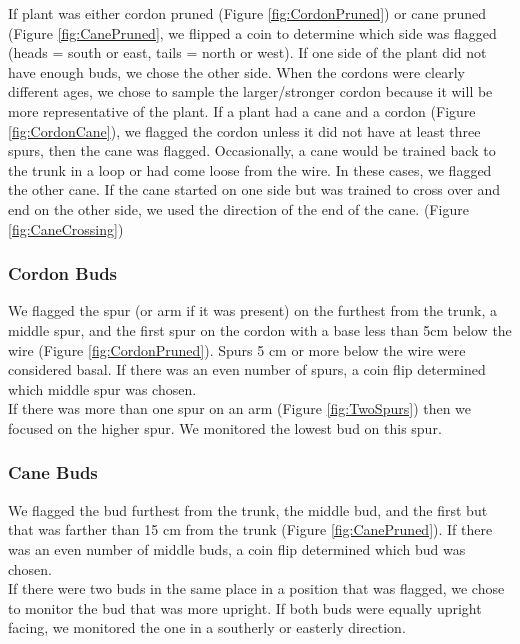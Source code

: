 \documentclass[11pt,letter]{article}
\begin{document}
If plant was either cordon pruned (Figure \ref{fig:CordonPruned}) or cane pruned (Figure \ref{fig:CanePruned}, we flipped a coin to determine which side was flagged (heads = south or east, tails = north or west). If one side of the plant did not have enough buds, we chose the other side. When the cordons were clearly different ages, we chose to sample the larger/stronger cordon because it will be more representative of the plant. If a plant had a cane and a cordon (Figure \ref{fig:CordonCane}), we flagged the cordon unless it did not have at least three spurs, then the cane was flagged. Occasionally, a cane would be trained back to the trunk in a loop or had come loose from the wire. In these cases, we flagged the other cane. If the cane started on one side but was trained to cross over and end on the other side, we used the direction of the end of the cane. (Figure \ref{fig:CaneCrossing})


\subsubsection{Cordon Buds}

We flagged the spur (or arm if it was present) on the furthest from the trunk, a middle spur, and the first spur on the cordon with a base less than 5cm below the wire (Figure \ref{fig:CordonPruned}). Spurs 5 cm or more below the wire were considered basal. If there was an even number of spurs, a coin flip determined which middle spur was chosen. \\

If there was more than one spur on an arm (Figure \ref{fig:TwoSpurs}) then we focused on the higher spur. We monitored the lowest bud on this spur. 

\subsubsection{Cane Buds}

We flagged the bud furthest from the trunk, the middle bud, and the first but that was farther than 15 cm from the trunk (Figure \ref{fig:CanePruned}). If there was an even number of middle buds, a coin flip determined which bud was chosen. \\

If there were two buds in the same place in a position that was flagged, we chose to monitor the bud that was more upright. If both buds were equally upright facing, we monitored the one in a southerly or easterly direction. 
\end{document}
